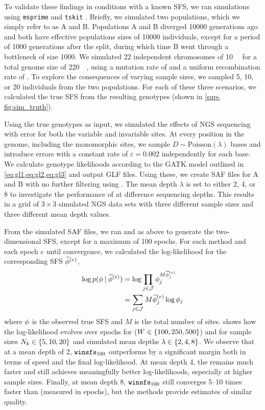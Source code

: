 To validate these findings in conditions with a known SFS, we ran simulations using \texttt{msprime} \cite{Baumdicker2021} and \texttt{tskit} \cite{Kelleher2018}.
Briefly, we simulated two populations, which we simply refer to as A and B.
Populations A and B diverged \num{10000} generations ago and both have effective populations sizes of \num{10000} individuals, except for a period of \num{1000} generations after the split, during which time B went through a bottleneck of size \num{1000}.
We simulated \num{22} independent chromosomes of \SI{10}{\mega\bases} for a total genome size of \SI{220}{\mega\bases}, using a mutation rate of  and a uniform recombination rate of .
To explore the consequences of varying sample sizes, we sampled \num{5}, \num{10}, or \num{20} individuals from the two populations.
For each of these three scenarios, we calculated the true SFS from the resulting genotypes (shown in \cref{sup-fig:sim_truth}).

Using the true genotypes as input, we simulated the effects of NGS sequencing with error for both the variable and invariable sites.
At every position in the genome, including the monomorphic sites, we sample $D \sim \text{Poisson}(\lambda)$ bases and introduce errors with a constant rate of $\varepsilon = 0.002$ independently for each base.
We calculate genotype likelihoods according to the GATK model outlined in \cref{eq:gl1,eq:gl2,eq:gl3} and output GLF files.
Using these, we create SAF files for A and B with no further filtering using \angsd.
The mean depth $\lambda$ is set to either \num{2}, \num{4}, or \num{8} to investigate the performance of \winsfs at difference sequencing depths.
This results in a grid of $3 \times 3$ simulated NGS data sets with three different sample sizes and three different mean depth values.

From the simulated SAF files, we ran \winsfs and \realsfs as above to generate the two-dimensional SFS, except for a maximum of \num{100} epochs.
For each method and each epoch $e$ until convergence, we calculated the log-likelihood for the corresponding SFS $\estsfs[e]$,
%
\begin{align}
    \log \prob(\sfs \given \estsfs[e]) 
    &= \log \prod_{j \in \ctset} \sfs_j^{M \estsfs[e]_j} \nonumber \\
    &= \sum_{j \in \ctset} M \estsfs[e]_j \log \sfs_j
\end{align}
%
where $\phi$ is the observed true SFS and $M$ is the total number of sites.
 shows how the log-likelihood evolves over epochs for \winsfs ($W \in \{100, 250, 500\}$) and \realsfs for sample sizes $N_k \in \{5, 10, 20\}$ and simulated mean depths $\lambda \in \{2, 4, 8\}$.
We observe that at a mean depth of \num{2}, $\winsfs[100]$ outperforms \realsfs by a significant margin both in terms of speed and the final log-likelihood.
At mean depth \num{4}, the \winsfs remains much faster and still achieves meaningfully better log-likelihoods, especially at higher sample sizes.
Finally, at mean depth \num{8}, $\winsfs[100]$ still converges \numrange{5}{10} times faster than \realsfs (measured in epochs), but the methods provide estimates of similar quality.

